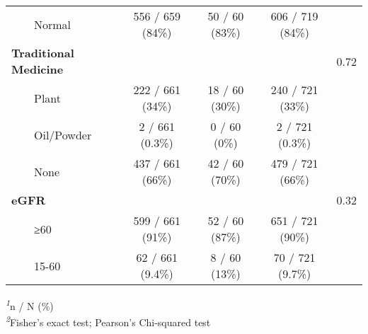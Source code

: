 \documentclass[
]{article}
\begin{document}
\begin{longtable}{lcccc}
    Normal & 556 / 659 (84\%) & 50 / 60 (83\%) & 606 / 719 (84\%) &  \\ 
\textbf{Traditional Medicine} &  &  &  & 0.72 \\ 
    Plant & 222 / 661 (34\%) & 18 / 60 (30\%) & 240 / 721 (33\%) &  \\ 
    Oil/Powder & 2 / 661 (0.3\%) & 0 / 60 (0\%) & 2 / 721 (0.3\%) &  \\ 
    None & 437 / 661 (66\%) & 42 / 60 (70\%) & 479 / 721 (66\%) &  \\ 
\textbf{eGFR} &  &  &  & 0.32 \\ 
    ≥60 & 599 / 661 (91\%) & 52 / 60 (87\%) & 651 / 721 (90\%) &  \\ 
    15-60 & 62 / 661 (9.4\%) & 8 / 60 (13\%) & 70 / 721 (9.7\%) &  \\ 
\bottomrule
\end{longtable}
\begin{minipage}{\linewidth}
\textsuperscript{\textit{1}}n / N (\%)\\
\textsuperscript{\textit{2}}Fisher's exact test; Pearson's Chi-squared test\\
\end{minipage}
\end{document}
